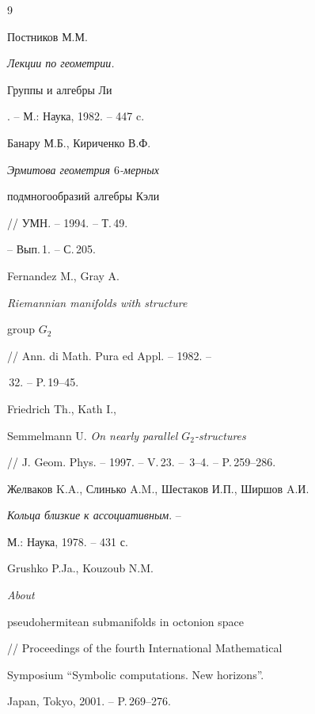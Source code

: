 \begin{thebibliography}{9}







Постников М.М. {\em Лекции по геометрии.


Группы и алгебры Ли}. -- М.: Наука, 1982. -- 447 c.




Банару М.Б., Кириченко В.Ф. {\em Эрмитова геометрия $6$-мерных


подмногообразий алгебры Кэли} // УМН. -- 1994. -- Т.\,49.


-- Вып.\,1. -- С.\,205.




Fernandez M., Gray A. {\em Riemannian manifolds with structure


group $G_2$} // Ann. di Math. Pura ed Appl. -- 1982. --


\No\,32. -- P.\,19--45.




Friedrich Th., Kath I.,


Semmelmann U. {\em On nearly parallel $G_2$-structures}


// J. Geom. Phys. -- 1997. -- V.\,23. -- \No\,3--4. -- P.\,259--286.




Желваков K.A., Слинько A.M., Шестаков И.П., Ширшов A.И.


{\em Кольца близкие к ассоциативным}. --


М.: Наука, 1978. -- 431 с.




Grushko P.Ja., Kouzoub N.M. {\em About


pseudohermitean submanifolds in octonion space}


// Pro\-ceed\-ings of the fourth International Mathematical


Symposium ``Symbolic computations. New horizons''.


Japan, Tokyo, 2001. -- P.\,269--276.





\end{thebibliography}





\vskip 2cm





